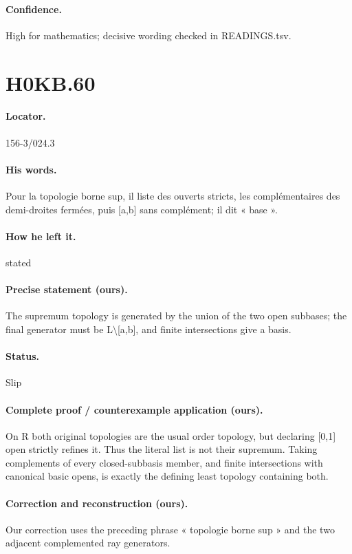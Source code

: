 \paragraph{Confidence.} High for mathematics; decisive wording checked in READINGS.tsv.

\section*{H0KB.60}\label{statement:H0KB.60}
\paragraph{Locator.} 156-3/024.3

\paragraph{His words.} Pour la topologie borne sup, il liste des ouverts stricts, les complémentaires des demi-droites fermées, puis [a,b] sans complément; il dit « base ».

\paragraph{How he left it.} stated

\paragraph{Precise statement (ours).} The supremum topology is generated by the union of the two open subbases; the final generator must be L\ensuremath{\setminus}[a,b], and finite intersections give a basis.

\paragraph{Status.} Slip

\paragraph{Complete proof / counterexample application (ours).} On R both original topologies are the usual order topology, but declaring [0,1] open strictly refines it. Thus the literal list is not their supremum. Taking complements of every closed-subbasis member, and finite intersections with canonical basic opens, is exactly the defining least topology containing both.

\paragraph{Correction and reconstruction (ours).} Our correction uses the preceding phrase « topologie borne sup » and the two adjacent complemented ray generators.

